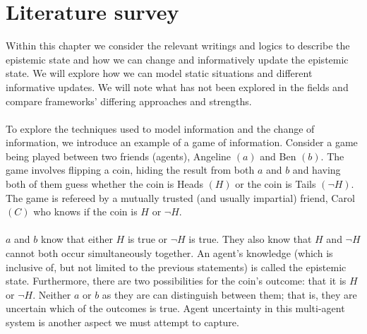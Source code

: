 \chapter{Literature survey} \label{lit_survey}

Within this chapter we consider the relevant writings and logics to describe
the epistemic state and how we can change and informatively update the epistemic
state.
We will explore how we can model static situations and
different informative updates.
We will note what has not been explored in the fields and compare frameworks'
differing approaches and strengths.\\
\\
To explore the techniques used to model information and the change of information, we introduce an
example of a game of information.
Consider a game being played between two friends (agents), Angeline $(a)$
and Ben $(b)$.
The game involves flipping a coin, hiding the result from both $a$ and $b$ and
having both of them guess whether the coin is Heads $(H)$ or the coin is Tails
$(\neg H)$.
The game is refereed by a mutually trusted (and usually impartial) friend, Carol
$(C)$ who knows if the coin is $H$ or $\neg H$.\\
\\
$a$ and $b$ know that either $H$ is true or $\neg H$ is true.
They also know that $H$ and $\neg H$ cannot both occur simultaneously together.
An agent's knowledge (which is inclusive of, but not limited to the previous
statements) is called the epistemic state.
Furthermore, there are two possibilities for the coin's outcome: that it is $H$
or $\neg H$.
Neither $a$ or $b$ as they are can distinguish between them; that is, they are
uncertain which of the outcomes is true.
Agent uncertainty in this multi-agent system is another aspect we must attempt
to capture.

